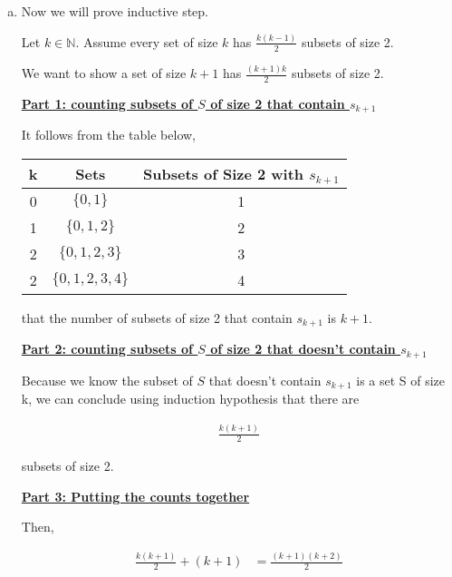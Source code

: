 \documentclass[12pt]{article}
\begin{document}
\begin{enumerate}[a.]
    \item

    Now we will prove inductive step.

    \bigskip

    Let $k \in \mathbb{N}$. Assume every set of size $k$ has $\frac{k(k-1)}{2}$
    subsets of size 2.

    \bigskip

    We want to show a set of size $k+1$ has $\frac{(k+1)k}{2}$ subsets of size 2.

    \bigskip

    \underline{\textbf{Part 1: counting subsets of $S$ of size 2 that contain $s_{k+1}$}}

    \bigskip

    It follows from the table below,

    \begin{tabular}{|c|c|c|}
        \hline
        k & Sets & Subsets of Size 2 with $s_{k+1}$\\
        \hline
        0 & $\{0,1\}$ & 1\\
        \hline
        1 & $\{0,1,2\}$ & 2\\
        \hline
        2 & $\{0,1,2,3\}$ & 3\\
        \hline
        2 & $\{0,1,2,3,4\}$ & 4\\
        \hline
    \end{tabular}

    that the number of subsets of size 2 that contain $s_{k+1}$ is $k+1$.

    \bigskip

    \underline{\textbf{Part 2: counting subsets of $S$ of size 2 that doesn't contain $s_{k+1}$}}

    \bigskip

    Because we know the subset of $S$ that doesn't contain $s_{k+1}$ is a set S
    of size k, we can conclude using induction hypothesis that there are

    \begin{align}
        \frac{k(k+1)}{2}
    \end{align}

    subsets of size 2.

    \bigskip

    \underline{\textbf{Part 3: Putting the counts together}}

    \bigskip

    Then,

    \begin{align}
        \frac{k(k+1)}{2} + (k+1) &= \frac{(k+1)(k+2)}{2}
    \end{align}


\end{enumerate}
\end{document}
